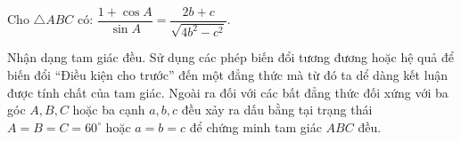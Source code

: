 \begin{bt}%
	Cho $ \triangle ABC $ có: $ \dfrac{1+\cos A}{\sin A}=\dfrac{2b+c}{\sqrt{4b^2-c^2}}. $
\end{bt}
\begin{dang}{Nhận dạng tam giác đều.}
	Sử dụng các phép biến đổi tương đương hoặc hệ quả để biến đổi ``Điều kiện cho
	trước'' đến một đẳng thức mà từ đó ta dể dàng kết luận được tính chất của tam giác.	Ngoài ra đối với các bất đẳng thức đối xứng với ba góc $ A,B,C $ hoặc ba cạnh $ a,b,c $ đều xảy ra dấu bằng tại trạng thái $ A=B=C=60^{\circ} $ hoặc $ a=b=c $ để chứng minh tam giác $ ABC $ đều.
\end{dang}
\setcounter{vd}{0}
